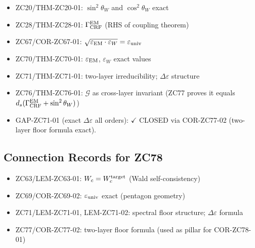 \documentclass[12pt, a4paper]{article}
\begin{document}
\begin{inheritbox}[title={ZC77 --- Backward Inheritance from Parts A--I}]
\begin{itemize}[noitemsep, leftmargin=1.5em]
  \item ZC20/THM-ZC20-01: $\sin^2\theta_W$ and $\cos^2\theta_W$ exact
  \item ZC28/THM-ZC28-01: $\Gamma_{\rm CRF}^{\rm EM}$ (RHS of coupling theorem)
  \item ZC67/COR-ZC67-01: $\sqrt{\varepsilon_{\rm EM}\cdot\varepsilon_W} = \varepsilon_{\rm univ}$
  \item ZC70/THM-ZC70-01: $\varepsilon_{\rm EM}$, $\varepsilon_W$ exact values
  \item ZC71/THM-ZC71-01: two-layer irreducibility; $\Delta\varepsilon$ structure
  \item ZC76/THM-ZC76-01: $\mathcal{G}$ as cross-layer invariant (ZC77 proves it equals $d_s(\Gamma_{\rm CRF}^{\rm EM} + \sin^2\theta_W)$)
\end{itemize}
\end{inheritbox}

\begin{correctionbox}[title={ZC77 --- Forward Corrections / Gap Closures}]
\begin{itemize}[noitemsep, leftmargin=1.5em]
  \item GAP-ZC71-01 (exact $\Delta\varepsilon$ all orders):
    \textcolor{crfgreen}{$\checkmark$ CLOSED} via COR-ZC77-02
    (two-layer floor formula exact).
\end{itemize}
\end{correctionbox}

\subsection{Connection Records for ZC78}

\begin{inheritbox}[title={ZC78 --- Backward Inheritance from Parts A--I}]
\begin{itemize}[noitemsep, leftmargin=1.5em]
  \item ZC63/LEM-ZC63-01: $W_c = W_c^{\rm target}$ (Wald self-consistency)
  \item ZC69/COR-ZC69-02: $\varepsilon_{\rm univ}$ exact (pentagon geometry)
  \item ZC71/LEM-ZC71-01, LEM-ZC71-02: spectral floor structure;
    $\Delta\varepsilon$ formula
  \item ZC77/COR-ZC77-02: two-layer floor formula (used as pillar for COR-ZC78-01)
\end{itemize}
\end{inheritbox}
\end{document}
